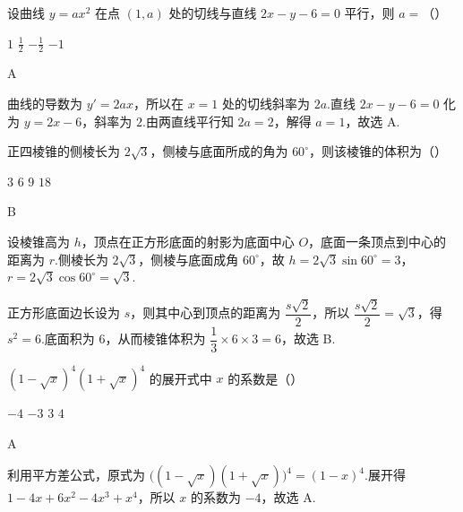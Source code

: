 \begin{problem}
设曲线 \(y = ax^2\) 在点 \((1, a)\) 处的切线与直线 \(2x - y - 6 = 0\) 平行，则 \(a =\)（\quad）

\choices
    {\(1\)}
    {\(\frac{1}{2}\)}
    {\(-\frac{1}{2}\)}
    {\(-1\)}
\end{problem}

\begin{answer}
A
\end{answer}

\begin{solution}
曲线的导数为 \(y'=2ax\)，所以在 \(x=1\) 处的切线斜率为 \(2a\).直线 \(2x-y-6=0\) 化为 \(y=2x-6\)，斜率为 \(2\).由两直线平行知 \(2a=2\)，解得 \(a=1\)，故选 A.
\end{solution}

\begin{problem}
正四棱锥的侧棱长为 \(2\sqrt{3}\)，侧棱与底面所成的角为 \(60^{\circ}\)，则该棱锥的体积为（\quad）

\choices
    {\(3\)}
    {\(6\)}
    {\(9\)}
    {\(18\)}
\end{problem}

\begin{answer}
B
\end{answer}

\begin{solution}
设棱锥高为 \(h\)，顶点在正方形底面的射影为底面中心 \(O\)，底面一条顶点到中心的距离为 \(r\).侧棱长为 \(2\sqrt3\)，侧棱与底面成角 \(60^{\circ}\)，故
\(h=2\sqrt3\sin60^{\circ}=3\)，\(r=2\sqrt3\cos60^{\circ}=\sqrt3\).

正方形底面边长设为 \(s\)，则其中心到顶点的距离为 \(\dfrac{s\sqrt2}{2}\)，所以 \(\dfrac{s\sqrt2}{2}=\sqrt3\)，得 \(s^2=6\).底面积为 \(6\)，从而棱锥体积为 \(\dfrac13\times6\times3=6\)，故选 B.
\end{solution}

\begin{problem}
\((1 - \sqrt{x})^4 (1 + \sqrt{x})^4\) 的展开式中 \(x\) 的系数是（\quad）

\choices
    {\(-4\)}
    {\(-3\)}
    {\(3\)}
    {\(4\)}
\end{problem}

\begin{answer}
A
\end{answer}

\begin{solution}
利用平方差公式，原式为 \(\bigl((1-\sqrt{x})(1+\sqrt{x})\bigr)^4=(1-x)^4\).展开得
\(1-4x+6x^2-4x^3+x^4\)，所以 \(x\) 的系数为 \(-4\)，故选 A.
\end{solution}

